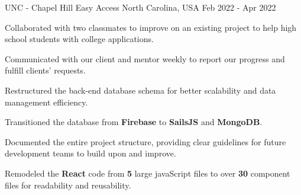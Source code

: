 \begin{cventries}
  \cventry
  {UNC - Chapel Hill} %
  {Easy Access} %
  {North Carolina, USA} %
  {Feb 2022 - Apr 2022} %
  {
    \begin{cvitems} %
      \item {Collaborated with two classmates to improve on an existing project to help high school students with college applications.}
      \item {Communicated with our client and mentor weekly to report our progress and fulfill clients' requests.}
      \item {Restructured the back-end database schema for better scalability and data management efficiency.}
      \item {Transitioned the database from \textbf{Firebase} to \textbf{SailsJS} and \textbf{MongoDB}.}
      \item {Documented the entire project structure, providing clear guidelines for future development teams to build upon and improve.}
      \item {Remodeled the \textbf{React} code from \textbf{5} large javaScript files to over \textbf{30} component files for readability and reusability.}
    \end{cvitems}
  }


\end{cventries}
